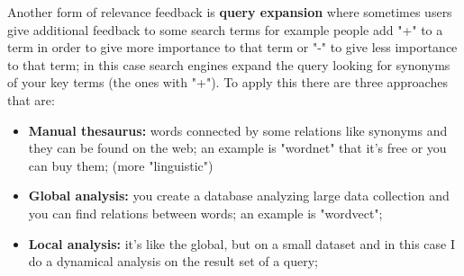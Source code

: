 Another form of relevance feedback is \textbf{query expansion} where sometimes users give additional feedback to some search terms for example people add "+" to a term in order to give more importance to that term or "-" to give less importance to that term; in this case search engines expand the query looking for synonyms of your key terms (the ones with "+"). To apply this there are three approaches that are:
\begin{itemize}
    \item \textbf{Manual thesaurus:} words connected by some relations like synonyms and they can be found on the web; an example is "wordnet" that it's free or you can buy them; (more "linguistic")
    \item \textbf{Global analysis:} you create a database analyzing large data collection and you can find relations between words; an example is "wordvect";
    \item \textbf{Local analysis:} it's like the global, but on a small dataset and in this case I do a dynamical analysis on the result set of a query;
\end{itemize}

